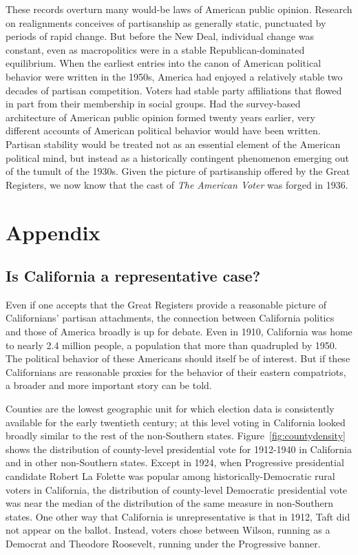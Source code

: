 \documentclass[11pt]{scrartcl}\usepackage[]{graphicx}\usepackage[]{color}
\begin{document}
These records overturn many would-be laws of American public opinion. Research on realignments conceives of partisanship as generally static, punctuated by periods of rapid change. But before the New Deal, individual change was constant, even as macropolitics were in a stable Republican-dominated equilibrium. When the earliest entries into the canon of American political behavior were written in the 1950s, America had enjoyed a relatively stable two decades of partisan competition. Voters had stable party affiliations that flowed in part from their membership in social groups. Had the survey-based architecture of American public opinion formed twenty years earlier, very different accounts of American political behavior would have been written. Partisan stability would be treated not as an essential element of the American political mind, but instead as a historically contingent phenomenon emerging out of the tumult of the 1930s. Given the picture of partisanship offered by the Great Registers, we now know that the cast of \textit{The American Voter} was forged in 1936.




\clearpage



\appendix


\FloatBarrier
\newpage
\section*{Appendix}
\subsection*{Is California a representative case?}

Even if one accepts that the Great Registers provide a reasonable picture of Californians' partisan attachments, the connection between California politics and those of America broadly is up for debate. Even in 1910, California was home to nearly 2.4 million people, a population that more than quadrupled by 1950. The political behavior of these Americans should itself be of interest.  But if these Californians are reasonable proxies for the behavior of their eastern compatriots, a broader and more important story can be told.  


Counties are the lowest geographic unit for which election data is consistently available for the early twentieth century; at this level voting in California looked broadly similar to the rest of the non-Southern states.  Figure~\ref{fig:countydensity} shows the distribution of county-level presidential vote for 1912-1940 in California and in other non-Southern states. Except in 1924, when Progressive presidential candidate Robert La Folette was popular among historically-Democratic rural voters in California, the distribution of county-level Democratic presidential vote was near the median of the distribution of the same measure in non-Southern states. One other way that California is unrepresentative is that in 1912, Taft did not appear on the ballot. Instead, voters chose between Wilson, running as a Democrat and Theodore Roosevelt, running under the Progressive banner.
\end{document}
